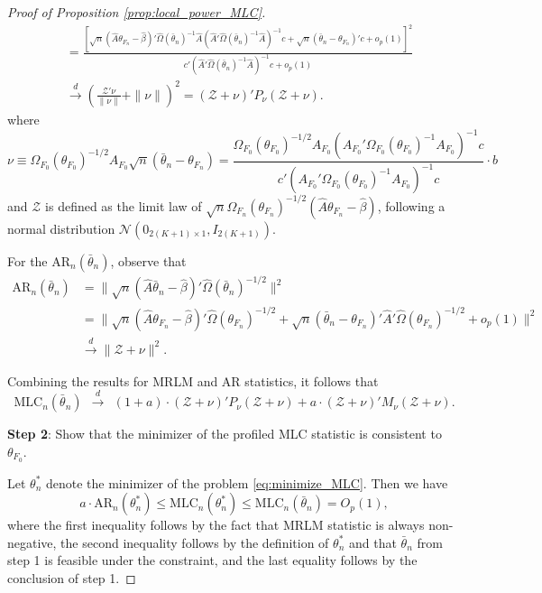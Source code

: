 \documentclass[11pt]{article}
\theoremstyle{definition}
\newcommand{\0}{\ensuremath{\mathbf{0}}}
\newcommand{\normal}{\ensuremath{\mathcal{N}}}
\begin{document}
\begin{bibunit}
\begin{proof}[Proof of Proposition \ref{prop:local_power_MLC}]
\begin{equation}
\begin{aligned}
        &= \frac{\left[\sqrt{n}(\hat{A}\theta_{F_n} - \hat{\beta})'\hat{\Omega}(\bar{\theta}_n)^{-1}\hat{A}\left(\hat{A}'\hat{\Omega}(\bar{\theta}_n)^{-1}\hat{A}\right)^{-1}c + \sqrt{n}(\bar{\theta}_n - \theta_{F_n})'c + o_p(1)\right]^2}{c'\left(\hat{A}'\hat{\Omega}(\bar{\theta}_n)^{-1}\hat{A}\right)^{-1}c + o_p(1)} \\
        &\xrightarrow{d} \left(\frac{\mathcal{Z}'\nu}{\|\nu\|} + \|\nu\|\right)^2  = (\mathcal{Z} + \nu)' P_\nu (\mathcal{Z} + \nu).
    \end{aligned}
    \end{equation}
    where
    \begin{equation}
    \label{eq:defn_nu_vec}
        \nu 
        \equiv {\Omega}_{F_0}({\theta}_{F_0})^{-1/2}{A}_{F_0}\sqrt{n}(\bar{\theta}_n - \theta_{F_n})
        = \frac{\Omega_{F_0}(\theta_{F_0})^{-1/2}{A}_{F_0}(A_{F_0}'\Omega_{F_0}(\theta_{F_0})^{-1} A_{F_0})^{-1} c}{c'(A_{F_0}'\Omega_{F_0}(\theta_{F_0})^{-1} A_{F_0})^{-1} c} \cdot b
    \end{equation}
    and $\mathcal{Z}$ is defined as the limit law of $\sqrt{n}\Omega_{F_n}(\theta_{F_n})^{-1/2}(\hat{A}\theta_{F_n} - \hat{\beta})$, following a normal distribution $\normal(0_{2(K+1)\times 1}, I_{2(K+1)})$.
    
    For the $\text{AR}_n(\bar{\theta}_n)$, observe that 
    \begin{align*}
        \text{AR}_n(\bar{\theta}_n)
        &= \|\sqrt{n}(\hat{A}\bar{\theta}_n - \hat{\beta})'\hat{\Omega}(\bar{\theta}_n)^{-1/2}\|^2 \\
        &= \|\sqrt{n}(\hat{A}\theta_{F_n} - \hat{\beta})'\hat{\Omega}(\theta_{F_n})^{-1/2} + \sqrt{n}(\bar{\theta}_n - \theta_{F_n})'\hat{A}'\hat{\Omega}(\theta_{F_n})^{-1/2} + o_p(1)\|^2 \\
        &\xrightarrow{d} \|\mathcal{Z} + \nu\|^2.
    \end{align*}

    Combining the results for MRLM and AR statistics, it follows that 
    \[
        \text{MLC}_n(\bar{\theta}_n) 
        ~~\xrightarrow{d}~~ 
        (1+a)\cdot (\mathcal{Z} + \nu)'P_\nu (\mathcal{Z} + \nu) + a\cdot(\mathcal{Z} + \nu)'M_{\nu}(\mathcal{Z} + \nu).
    \]
    
    \medskip
    \textbf{Step 2}: Show that the minimizer of the profiled MLC statistic is consistent to $\theta_{F_0}$.
    \medskip
    
    Let $\theta_n^*$ denote the minimizer of the problem \eqref{eq:minimize_MLC}. Then we have
    \[
        a\cdot \text{AR}_n(\theta_n^*) \leq \text{MLC}_n(\theta_n^*) \leq \text{MLC}_n(\bar{\theta}_n) = O_p(1),
    \]
    where the first inequality follows by the fact that MRLM statistic is always non-negative, the second inequality follows by the definition of $\theta_n^*$ and that $\bar{\theta}_n$ from step 1 is feasible under the constraint, and the last equality follows by the conclusion of step 1.


\end{proof}
\end{bibunit}
\end{document}
